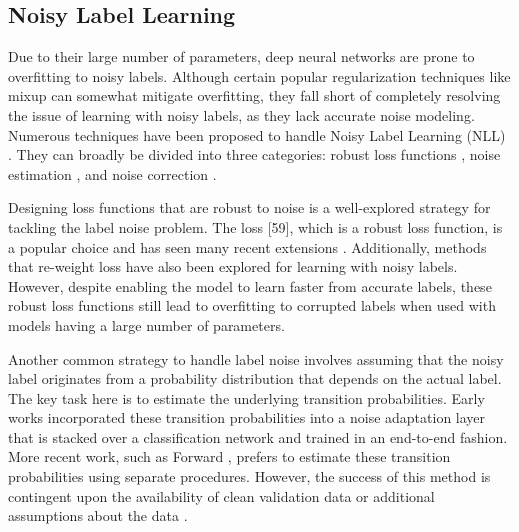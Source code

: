 \subsection{Noisy Label Learning}
Due to their large number of parameters, deep neural networks are prone to overfitting to noisy labels. Although certain popular regularization techniques like mixup \citep{zhang2017mixup} can somewhat mitigate overfitting, they fall short of completely resolving the issue of learning with noisy labels, as they lack accurate noise modeling.
Numerous techniques have been proposed to handle Noisy Label Learning (NLL) \citep{nllsurvey2022}. They can broadly be divided into three categories: robust loss functions \citep{Ghosh2017RobustLF, Zhang2018GeneralizedCE, Wang2019SymmetricCE, Ma2020NormalizedLF}, noise estimation \citep{Xiao2015LearningFM,Goldberger2016TrainingDN,Liu2020EarlyLearningRP,Zhang2021LearningNT,confidentlearn2021}, and noise correction \citep{Han2018CoteachingRT, Li2020DivideMixLW, sopliu22w}.

Designing loss functions that are robust to noise is a well-explored strategy for tackling the label noise problem. The  loss [59], which is a robust loss function, is a popular choice and has seen many recent extensions \citep{Zhang2018GeneralizedCE,Wang2019SymmetricCE,ma2020normalized, yu2020learning}. Additionally, methods that re-weight loss \citep{liu2016does} have also been explored for learning with noisy labels. However, despite enabling the model to learn faster from accurate labels, these robust loss functions still lead to overfitting to corrupted labels when used with models having a large number of parameters.

Another common strategy to handle label noise involves assuming that the noisy label originates from a probability distribution that depends on the actual label. The key task here is to estimate the underlying transition probabilities. Early works \citep{Goldberger2016TrainingDN} incorporated these transition probabilities into a noise adaptation layer that is stacked over a classification network and trained in an end-to-end fashion. More recent work, such as Forward \citep{Patrini2016MakingDN}, prefers to estimate these transition probabilities using separate procedures. However, the success of this method is contingent upon the availability of clean validation data \citep{confidentlearn2021} or additional assumptions about the data \citep{zhang2021learning}.

